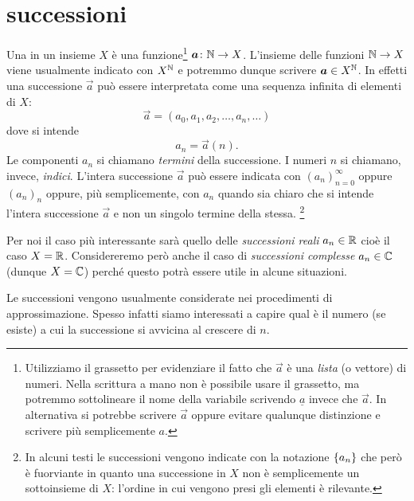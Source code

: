 \chapter{successioni}
\label{ch:successioni}

Una  in un insieme $X$ è una
funzione\footnote{%
Utilizziamo il grassetto per evidenziare il fatto
che $\vec a$ è una \emph{lista} (o vettore) di numeri.
Nella scrittura a mano non è possibile usare il grassetto, ma potremmo
sottolineare il nome della variabile scrivendo $\underline a$ invece che $\vec a$.
In alternativa si potrebbe scrivere $\stackrel{\rightarrow}a$ oppure evitare
qualunque distinzione e scrivere più semplicemente $a$.}
$\boldsymbol a\colon \mathbb N \to X$.
L'insieme delle funzioni $\mathbb N \to X$ viene usualmente indicato
con $X^\mathbb N$ e potremmo dunque scrivere $\boldsymbol a \in X^\mathbb N$. In effetti una successione $\vec a$ può essere interpretata
come una sequenza infinita di elementi di $X$:
\[
  \vec a = (a_0, a_1, a_2, \dots, a_n, \dots )
\]
dove si intende
\[
   a_n = \vec a(n).
\]
Le componenti $a_n$ si chiamano \emph{termini} della successione.
I numeri $n$ si chiamano, invece, \emph{indici}.
L'intera
successione $\vec a$ può essere indicata con $(a_n)_{n=0}^\infty$
oppure $(a_n)_n$ oppure,
più semplicemente, con $a_n$ quando sia chiaro che si intende l'intera
successione $\vec a$ e non un singolo termine della stessa.%
\footnote{In alcuni testi le successioni vengono indicate
con la notazione ${\left\{ a_n \right\}}$ che però è fuorviante in quanto
una successione in $X$ non è semplicemente un sottoinsieme di $X$:
l'ordine in cui vengono presi gli elementi è rilevante.}

Per noi il caso più interessante sarà quello delle \emph{successioni reali}
$a_n\in \mathbb R$ cioè il caso $X=\mathbb R$. Considereremo però anche il caso di
\emph{successioni complesse} $a_n\in \mathbb C$ (dunque $X=\mathbb C$) perché questo
potrà essere utile in alcune situazioni.

Le successioni vengono usualmente
considerate nei procedimenti di approssimazione.
Spesso infatti siamo interessati a capire qual è il numero (se esiste) a cui
la successione si avvicina al crescere di $n$.

